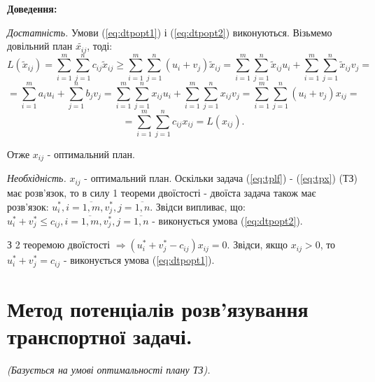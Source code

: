 \documentclass[12pt,a4paper]{report}
\begin{document}
{\bf Доведення:}

{\it Достатність.} Умови (\ref{eq:dtpopt1}) і (\ref{eq:dtpopt2}) виконуються. Візьмемо довільний план $\tilde{x_{ij}}$, тоді:\\
\[ L(\tilde{x}_{ij}) = \sum_{i=1}^m \sum_{j=1}^n c_{ij} \tilde{x}_{ij} \geq
 \sum_{i=1}^m \sum_{j=1}^n (u_i+v_j) \tilde{x}_{ij} = 
 \sum_{i=1}^m \sum_{j=1}^n \tilde{x}_{ij} u_i + \sum_{i=1}^m \sum_{j=1}^n  \tilde{x}_{ij} v_j = \]
\[ = \sum_{i=1}^m a_i u_i + \sum_{j=1}^n b_j v_j =
 \sum_{i=1}^m \sum_{j=1}^n x_{ij} u_i + \sum_{i=1}^m \sum_{j=1}^n  x_{ij} v_j =
 \sum_{i=1}^m \sum_{j=1}^n (u_i+v_j) x_{ij} = \]
\[ = \sum_{i=1}^m \sum_{j=1}^n c_{ij} x_{ij} = L(x_{ij}). \]

Отже $x_{ij}$ - оптимальний план.

{\it Необхідність.} $x_{ij}$ - оптимальний план. Оскільки задача (\ref{eq:tplf}) - (\ref{eq:tpx}) (ТЗ) має розв’язок, то в силу 1 теореми двоїстості - двоїста задача також має розв’язок: $u^*_i, i = \overline{1,m}, v^*_j, j= \overline{1,n}$. Звідси випливає, що: $u^*_i+v^*_j \leq c_{ij}, i = \overline{1,m}, v^*_j, j= \overline{1,n}$ - виконується умова (\ref{eq:dtpopt2}).

З 2 теоремою двоїстості $\Rightarrow (u^*_i + v^*_j - c_{ij})x_{ij}=0$. Звідси, якщо $x_{ij}>0$, то $u^*_i + v^*_j = c_{ij}$ - виконується умова (\ref{eq:dtpopt1}).

\clearpage

\chapter{Метод потенціалів розв'язування транспортної задачі.}

\emph{(Базується на умові оптимальності плану ТЗ).}
\end{document}
